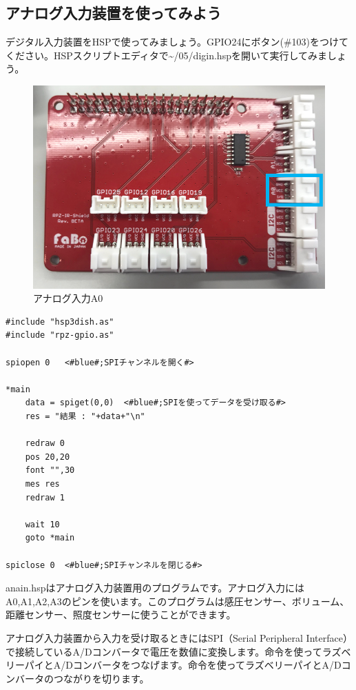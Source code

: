 \subsection{アナログ入力装置を使ってみよう}
デジタル入力装置をHSPで使ってみましょう。GPIO24にボタン(\#103)をつけてください。HSPスクリプトエディタで\textasciitilde /05/digin.hspを開いて実行してみましょう。\\
\begin{figure}[H]
    \centering
    \includegraphics[scale=0.8]{images/chap05/text05-img030.png}
    \caption{アナログ入力A0}
\end{figure}

\begin{lstlisting}[caption=anain.hsp,label=anain.hsp]
#include "hsp3dish.as"
#include "rpz-gpio.as"

spiopen 0	<#blue#;SPIチャンネルを開く#>

*main
	data = spiget(0,0)	<#blue#;SPIを使ってデータを受け取る#>
	res = "結果 : "+data+"\n"

	redraw 0
	pos 20,20
	font "",30
	mes res
	redraw 1

	wait 10
	goto *main

spiclose 0	<#blue#;SPIチャンネルを閉じる#>
\end{lstlisting}

anain.hspはアナログ入力装置用のプログラムです。アナログ入力にはA0,A1,A2,A3のピンを使います。このプログラムは感圧センサー、ボリューム、距離センサー、照度センサーに使うことができます。

アナログ入力装置から入力を受け取るときにはSPI（Serial Peripheral Interface）で接続しているA/Dコンバータで電圧を数値に変換します。命令を使ってラズベリーパイとA/Dコンバータをつなげます。命令を使ってラズベリーパイとA/Dコンバータのつながりを切ります。

